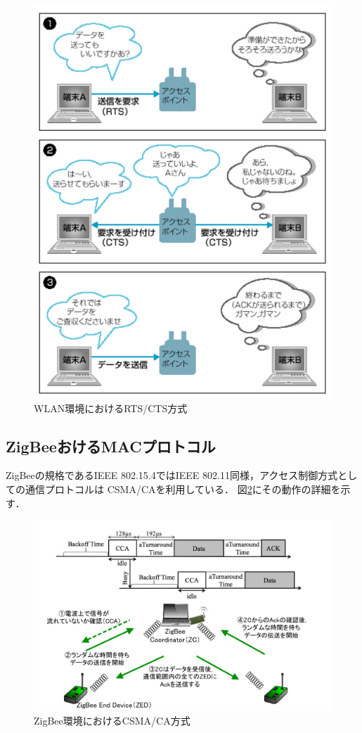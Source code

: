 \documentclass[12pt]{jreport}
\begin{document}
\begin{figure}[bt]
 \centering
 \includegraphics[width=0.8\columnwidth]{figure/rts_cts.pdf}
 \caption{WLAN環境におけるRTS/CTS方式}
 \label{fig:rts_cts}
\end{figure}

\subsection{ZigBeeおけるMACプロトコル}
\label{sec:ieee_ 802.15.4}

ZigBeeの規格であるIEEE 802.15.4ではIEEE 802.11同様，アクセス制御方式としての通信プロトコルは
CSMA/CAを利用している．
図\ref{fig:csma_ca_zigbee}にその動作の詳細を示す．

\begin{figure}[bt]
 \centering
 \includegraphics[width=\columnwidth]{figure/csma_ca_zigbee.pdf}
 \caption{ZigBee環境におけるCSMA/CA方式}
 \label{fig:csma_ca_zigbee}
\end{figure}
\end{document}
